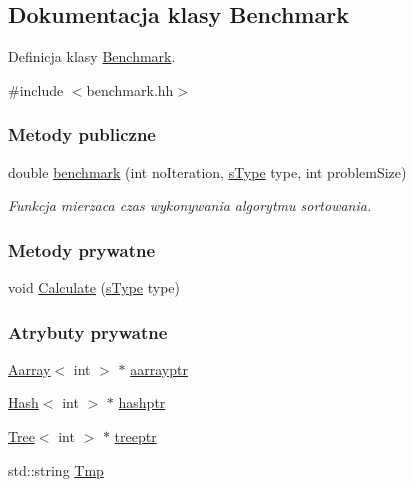 \hypertarget{class_benchmark}{\subsection{Dokumentacja klasy Benchmark}
\label{class_benchmark}
}


Definicja klasy \hyperlink{class_benchmark}{Benchmark}.  




{\ttfamily \#include $<$benchmark.\-hh$>$}

\subsubsection*{Metody publiczne}
\begin{DoxyCompactItemize}
\item 
double \hyperlink{class_benchmark_a44b4b9db409e50cc0d9e00f8ec4a9c17}{benchmark} (int no\-Iteration, \hyperlink{benchmark_8hh_aea0d9887a477b37857cd2037b9c9ad31}{s\-Type} type, int problem\-Size)
\begin{DoxyCompactList}\small\item\em Funkcja mierzaca czas wykonywania algorytmu sortowania. \end{DoxyCompactList}\end{DoxyCompactItemize}
\subsubsection*{Metody prywatne}
\begin{DoxyCompactItemize}
\item 
void \hyperlink{class_benchmark_a706adeea3f78bb12170973bd073bc6ee}{Calculate} (\hyperlink{benchmark_8hh_aea0d9887a477b37857cd2037b9c9ad31}{s\-Type} type)
\end{DoxyCompactItemize}
\subsubsection*{Atrybuty prywatne}
\begin{DoxyCompactItemize}
\item 
\hyperlink{class_aarray}{Aarray}$<$ int $>$ $\ast$ \hyperlink{class_benchmark_a3bdbd0990bf2fe54258283e6e343f3f2}{aarrayptr}
\item 
\hyperlink{class_hash}{Hash}$<$ int $>$ $\ast$ \hyperlink{class_benchmark_a73d14cbb7e487ed246375c37aa182f65}{hashptr}
\item 
\hyperlink{class_tree}{Tree}$<$ int $>$ $\ast$ \hyperlink{class_benchmark_a320c05da135d117cd23592bede8ed38b}{treeptr}
\item 
std\-::string \hyperlink{class_benchmark_aeca480b43b86f98b0d065ae910acdb8b}{Tmp}
\end{DoxyCompactItemize}


